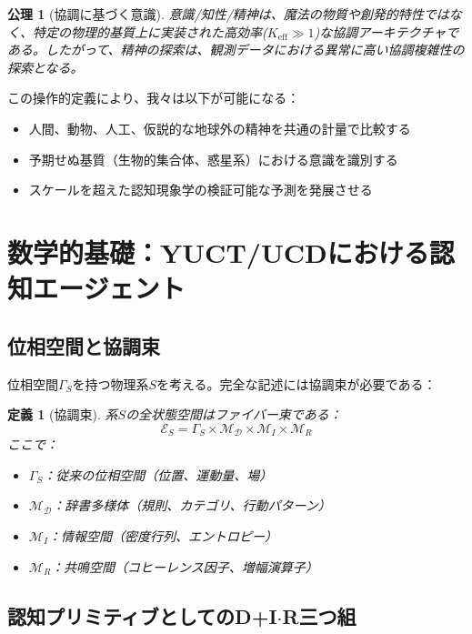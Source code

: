 \documentclass[11pt,a4paper]{article}
\newtheorem{definition}{定義}
\newtheorem{axiom}{公理}
\newcommand{\eff}{\mathrm{eff}}
\newcommand{\Dict}{\mathcal{D}}
\newcommand{\Mdict}{\mathcal{M}_{\Dict}}
\newcommand{\Ke}{K_{\eff}}
\begin{document}
	\begin{axiom}[協調に基づく意識]
		意識/知性/精神は、魔法の物質や創発的特性ではなく、特定の物理的基質上に実装された高効率(\(\Ke \gg 1\))な協調アーキテクチャである。したがって、精神の探索は、観測データにおける異常に高い協調複雑性の探索となる。
	\end{axiom}
	
	この操作的定義により、我々は以下が可能になる：
	\begin{itemize}
		\item 人間、動物、人工、仮説的な地球外の精神を共通の計量で比較する
		\item 予期せぬ基質（生物的集合体、惑星系）における意識を識別する
		\item スケールを超えた認知現象学の検証可能な予測を発展させる
	\end{itemize}
	
	\section{数学的基礎：YUCT/UCDにおける認知エージェント}
	
	\subsection{位相空間と協調束}
	
	位相空間\(\Gamma_S\)を持つ物理系\(S\)を考える。完全な記述には協調束が必要である：
	
	\begin{definition}[協調束]
		系\(S\)の全状態空間はファイバー束である：
		\[
		\mathcal{E}_S = \Gamma_S \times \Mdict \times \mathcal{M}_I \times \mathcal{M}_R
		\]
		ここで：
		\begin{itemize}
			\item \(\Gamma_S\)：従来の位相空間（位置、運動量、場）
			\item \(\Mdict\)：辞書多様体（規則、カテゴリ、行動パターン）
			\item \(\mathcal{M}_I\)：情報空間（密度行列、エントロピー）
			\item \(\mathcal{M}_R\)：共鳴空間（コヒーレンス因子、増幅演算子）
		\end{itemize}
	\end{definition}
	
	\subsection{認知プリミティブとしてのD+I\(\cdot\)R三つ組}
	
\end{document}
